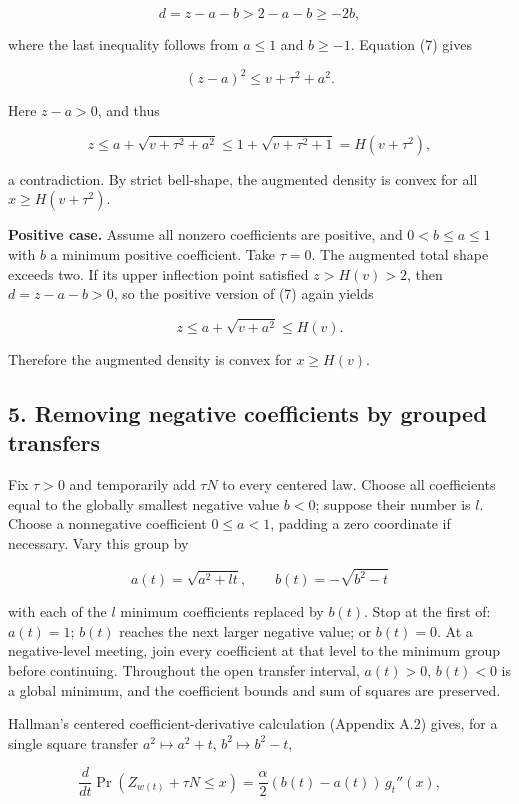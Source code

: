 \documentclass[10pt,a4paper]{article}
\begin{document}
\[
d=z-a-b>2-a-b\ge-2b,
\]

where the last inequality follows from \(a\le1\) and \(b\ge-1\).
Equation (7) gives

\[
(z-a)^2\le v+\tau^2+a^2.
\]

Here \(z-a>0\), and thus

\[
z\le a+\sqrt{v+\tau^2+a^2}
\le1+\sqrt{v+\tau^2+1}=H(v+\tau^2),
\]

a contradiction. By strict bell-shape, the augmented density is convex
for all \(x\ge H(v+\tau^2)\).

\textbf{Positive case.} Assume all nonzero coefficients are positive,
and \(0<b\le a\le1\) with \(b\) a minimum positive coefficient. Take
\(\tau=0\). The augmented total shape exceeds two. If its upper
inflection point satisfied \(z>H(v)>2\), then \(d=z-a-b>0\), so the
positive version of (7) again yields

\[
z\le a+\sqrt{v+a^2}\le H(v).
\]

Therefore the augmented density is convex for \(x\ge H(v)\).

\subsection{5. Removing negative coefficients by grouped
transfers}\label{removing-negative-coefficients-by-grouped-transfers}

Fix \(\tau>0\) and temporarily add \(\tau N\) to every centered law.
Choose all coefficients equal to the globally smallest negative value
\(b<0\); suppose their number is \(l\). Choose a nonnegative coefficient
\(0\le a<1\), padding a zero coordinate if necessary. Vary this group by

\[
a(t)=\sqrt{a^2+lt},\qquad
b(t)=-\sqrt{b^2-t}
\]

with each of the \(l\) minimum coefficients replaced by \(b(t)\). Stop
at the first of: \(a(t)=1\); \(b(t)\) reaches the next larger negative
value; or \(b(t)=0\). At a negative-level meeting, join every
coefficient at that level to the minimum group before continuing.
Throughout the open transfer interval, \(a(t)>0\), \(b(t)<0\) is a
global minimum, and the coefficient bounds and sum of squares are
preserved.

Hallman's centered coefficient-derivative calculation (Appendix A.2)
gives, for a single square transfer \(a^2\mapsto a^2+t\),
\(b^2\mapsto b^2-t\),

\[
\frac{d}{dt}\Pr(Z_{w(t)}+\tau N\le x)
=\frac\alpha2(b(t)-a(t))\,g_t''(x),                \tag{8}
\]
\end{document}
